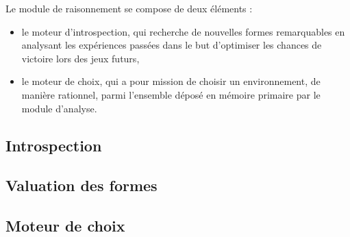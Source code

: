 Le module de raisonnement se compose de deux éléments : 
\begin{itemize}
\item le moteur d'introspection, qui recherche de nouvelles formes remarquables en analysant les expériences passées dans le but d'optimiser les chances de victoire lors des jeux futurs,
\item le moteur de choix, qui a pour mission de choisir un environnement, de manière rationnel, parmi l'ensemble déposé en mémoire primaire par le module d'analyse.
\end{itemize}


\subsection{Introspection}



\subsection{Valuation des formes}



\subsection{Moteur de choix}



